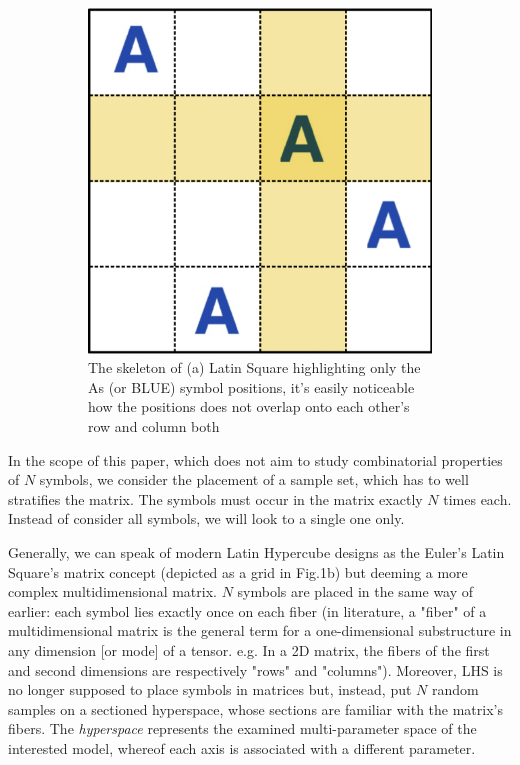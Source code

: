 \documentclass[12pt]{extarticle}
\newcommand{\midcaption}[1]{
    \captionsetup{justification=centering}
    \caption{#1}
}
\begin{document}
\begin{figure}[h]
\begin{subfigure}[b]{0.45\textwidth}
{        	\includegraphics[width=\textwidth]{src/imgs/latin_square_skeleton.png}
        	\caption{The skeleton of (a) Latin Square highlighting only the As (or BLUE) symbol positions, it's easily noticeable how the positions does not overlap onto each other's row and column both}
        	\label{fig:latin_square_b}
        }
    \end{subfigure}
    
    \midcaption{}
    \label{fig:latin_square}
\end{figure}

In the scope of this paper, which does not aim to study combinatorial properties of $N$ symbols, we consider the placement of a sample set, which has to well stratifies the matrix. The symbols must occur in the matrix exactly $N$ times each. Instead of consider all symbols, we will look to a single one only. 

Generally, we can speak of modern Latin Hypercube designs as the Euler's Latin Square's matrix concept (depicted as a grid in Fig.1b) but deeming a more complex multidimensional matrix. $N$ symbols are placed in the same way of earlier: each symbol lies exactly once on each fiber (in literature, a "fiber" of a multidimensional matrix is the general term for a one-dimensional substructure in any dimension [or mode] of a tensor. e.g. In a 2D matrix, the fibers of the first and second dimensions are respectively "rows" and "columns").
Moreover, LHS is no longer supposed to place symbols in matrices but, instead, put $N$ random samples on a sectioned hyperspace, whose sections are familiar with the matrix's fibers. The \textit{hyperspace} represents the examined multi-parameter space of the interested model, whereof each axis is associated with a different parameter.
\end{document}
